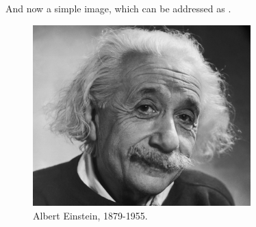     And now a simple image, which can be addressed as .

    \begin{figure}[H]
        \center
        \includegraphics[width=0.75\textwidth]{1st_chapter/img/albert-einstein.jpg}
        \caption[Albert Einstein]{Albert Einstein, 1879-1955.}
        \label{fig:albert-einstein}
    \end{figure}



